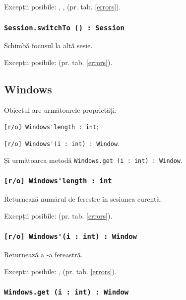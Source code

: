 Excepții posibile: , ,  (pr. tab. \ref{errors}).

\subsubsection{\lstinline|Session.switchTo () : Session|}

Schimbă focusul la altă sesie.

Excepții posibile:  (pr. tab. \ref{errors}).


\subsection{{\color{orange} Windows}}

Obiectul \windows{} are următoarele proprietăți:
\begin{icItems}
	\item \lstinline|[r/o] Windows'length : int|;
	\item \lstinline|[r/o] Windows'(i : int) : Window|.
\end{icItems}

Și următoarea metodă \lstinline|Windows.get (i : int) : Window|.

\subsubsection{\lstinline|[r/o] Windows'length : int|}

Returnează numărul de ferestre în sesiunea curentă.

Excepții posibile:  (pr. tab. \ref{errors}).

\subsubsection{\lstinline|[r/o] Windows'(i : int) : Window|}

Returnează a -a fereastră.

Excepții posibile: ,  (pr. tab. \ref{errors}).

\subsubsection{\lstinline|Windows.get (i : int) : Window|}

